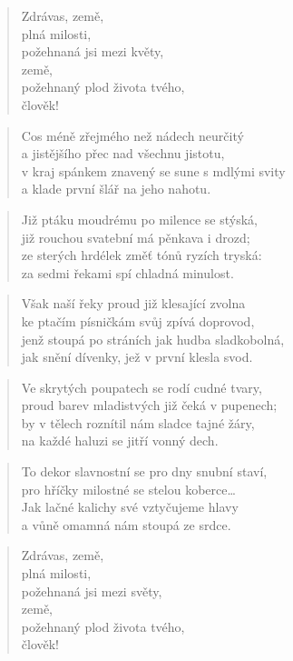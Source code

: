 \documentclass{book}
\begin{document}
\begin{verse}
Zdrávas, země,\\
plná milosti,\\
požehnaná jsi mezi květy,\\
země,\\
požehnaný plod života tvého,\\
člověk!
\end{verse}
\begin{verse}
Cos méně zřejmého než nádech neurčitý\\
a jistějšího přec nad všechnu jistotu,\\
v kraj spánkem znavený se sune s mdlými svity\\
a klade první šlář na jeho nahotu.
\end{verse}
\begin{verse}
Již ptáku moudrému po milence se stýská,\\
již rouchou svatební má pěnkava i drozd;\\
ze sterých hrdélek změť tónů ryzích tryská:\\
za sedmi řekami spí chladná minulost.
\end{verse}
\begin{verse}
Však naší řeky proud již klesající zvolna\\
ke ptačím písničkám svůj zpívá doprovod,\\
jenž stoupá po stráních jak hudba sladkobolná,\\
jak snění dívenky, jež v první klesla svod.
\end{verse}
\begin{verse}
Ve skrytých poupatech se rodí cudné tvary,\\
proud barev mladistvých již čeká v pupenech;\\
by v tělech roznítil nám sladce tajné žáry,\\
na každé haluzi se jitří vonný dech.
\end{verse}
\begin{verse}
To dekor slavnostní se pro dny snubní staví,\\
pro hříčky milostné se stelou koberce\ldots\\
Jak lačné kalichy své vztyčujeme hlavy\\
a vůně omamná nám stoupá ze srdce.
\end{verse}
\begin{verse}
Zdrávas, země,\\
plná milosti,\\
požehnaná jsi mezi světy,\\
země,\\
požehnaný plod života tvého,\\
člověk!
\end{verse}
\end{document}

